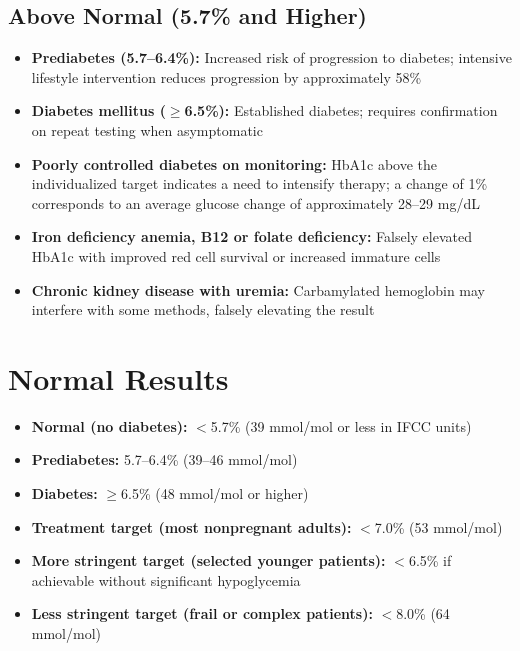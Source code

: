 \subsection*{Above Normal (5.7\% and Higher)}
\begin{itemize}
  \item \textbf{Prediabetes (5.7--6.4\%):} Increased risk of progression to diabetes; intensive lifestyle intervention reduces progression by approximately 58\%
  \item \textbf{Diabetes mellitus ($\geq$6.5\%):} Established diabetes; requires confirmation on repeat testing when asymptomatic
  \item \textbf{Poorly controlled diabetes on monitoring:} HbA1c above the individualized target indicates a need to intensify therapy; a change of 1\% corresponds to an average glucose change of approximately 28--29 mg/dL
  \item \textbf{Iron deficiency anemia, B12 or folate deficiency:} Falsely elevated HbA1c with improved red cell survival or increased immature cells
  \item \textbf{Chronic kidney disease with uremia:} Carbamylated hemoglobin may interfere with some methods, falsely elevating the result
\end{itemize}

\section*{Normal Results}
\begin{itemize}
  \item \textbf{Normal (no diabetes):} $<$5.7\% (39 mmol/mol or less in IFCC units)
  \item \textbf{Prediabetes:} 5.7--6.4\% (39--46 mmol/mol)
  \item \textbf{Diabetes:} $\geq$6.5\% (48 mmol/mol or higher)
  \item \textbf{Treatment target (most nonpregnant adults):} $<$7.0\% (53 mmol/mol)
  \item \textbf{More stringent target (selected younger patients):} $<$6.5\% if achievable without significant hypoglycemia
  \item \textbf{Less stringent target (frail or complex patients):} $<$8.0\% (64 mmol/mol)
\end{itemize}

